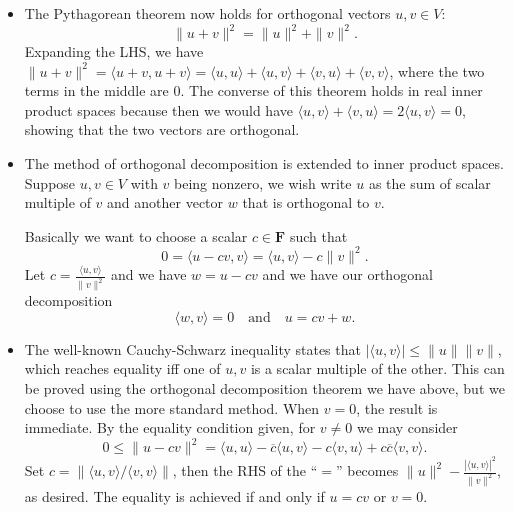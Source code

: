 \documentclass{article}
\newcommand{\F}{\mathbf{F}}
\newcommand{\conj}[1]{\overline{#1}}
\newcommand{\inp}[2]{\langle #1, #2 \rangle}
\newcommand{\nm}[1]{\| #1 \|}
\begin{document}
\begin{itemize}
\begin{itemize}
        \item The Pythagorean theorem now holds for orthogonal vectors $u,v \in V$: $$\|u+v\|^2 = \|u\|^2 + \|v\|^2.$$ Expanding the LHS, we have $\|u+v\|^2 = \inp{u+v}{u+v} = \inp{u}{u} + \inp{u}{v} + \inp{v}{u} + \inp{v}{v}$, where the two terms in the middle are 0.
        The converse of this theorem holds in real inner product spaces because then we would have $\inp{u}{v}+\inp{v}{u} = 2\inp{u}{v} = 0$, showing that the two vectors are orthogonal.
        \item The method of orthogonal decomposition is extended to inner product spaces. Suppose $u,v \in V$ with $v$ being nonzero, we wish write $u$ as the sum of scalar multiple of $v$ and another vector $w$ that is orthogonal to $v$.
        
        Basically we want to choose a scalar $c \in \F$ such that $$0 = \inp{u-cv}{v} = \inp{u}{v} - c\|v\|^2.$$ Let $c = \frac{\inp{u}{v}}{\|v\|^2}$ and we have $w = u - cv$ and we have our orthogonal decomposition $$\inp{w}{v} = 0 \quad \text{and} \quad u = cv+w.$$
        \item The well-known Cauchy-Schwarz inequality states that $|\inp{u}{v}| \leq \|u\|\|v\|$, which reaches equality iff one of $u,v$ is a scalar multiple of the other. This can be proved using the orthogonal decomposition theorem we have above, but we choose to use the more standard method. When $v = 0$, the result is immediate. By the equality condition given, for $v \not= 0$ we may consider $$0 \leq \|u - cv\|^2 = \inp{u}{u} - \conj{c}\inp{u}{v} - c\inp{v}{u} + c\conj{c}\inp{v}{v}.$$ Set $c = \nm{\inp{u}{v}/\inp{v}{v}}$, then the RHS of the ``$=$'' becomes $ \nm{u}^2 - \frac{|\inp{u}{v}|^2}{\nm{v}^2}$, as desired. The equality is achieved if and only if $u = cv$ or $v = 0$.
        

\end{itemize}
\end{itemize}
\end{document}
